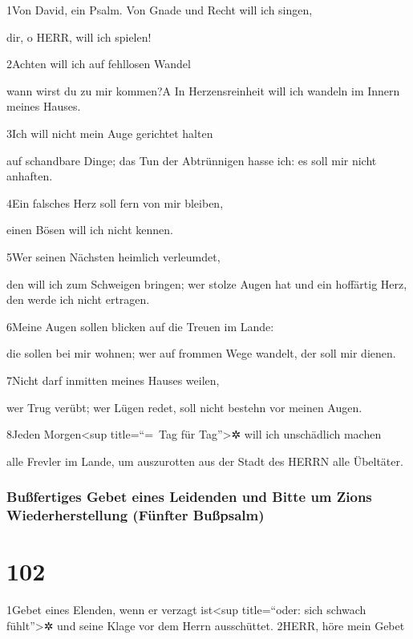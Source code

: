 1Von David, ein Psalm. Von Gnade und Recht will ich singen,

dir, o HERR, will ich spielen!

2Achten will ich auf fehllosen Wandel

wann wirst du zu mir kommen?{A} In Herzensreinheit will ich wandeln im
Innern meines Hauses.

3Ich will nicht mein Auge gerichtet halten

auf schandbare Dinge; das Tun der Abtrünnigen hasse ich: es soll mir
nicht anhaften.

4Ein falsches Herz soll fern von mir bleiben,

einen Bösen will ich nicht kennen.

5Wer seinen Nächsten heimlich verleumdet,

den will ich zum Schweigen bringen; wer stolze Augen hat und ein
hoffärtig Herz, den werde ich nicht ertragen.

6Meine Augen sollen blicken auf die Treuen im Lande:

die sollen bei mir wohnen; wer auf frommen Wege wandelt, der soll mir
dienen.

7Nicht darf inmitten meines Hauses weilen,

wer Trug verübt; wer Lügen redet, soll nicht bestehn vor meinen Augen.

8Jeden Morgen\textless sup title=``=~Tag für Tag''\textgreater✲ will ich
unschädlich machen

alle Frevler im Lande, um auszurotten aus der Stadt des HERRN alle
Übeltäter.

\hypertarget{buuxdffertiges-gebet-eines-leidenden-und-bitte-um-zions-wiederherstellung-fuxfcnfter-buuxdfpsalm}{%
\subsubsection{Bußfertiges Gebet eines Leidenden und Bitte um Zions
Wiederherstellung (Fünfter
Bußpsalm)}\label{buuxdffertiges-gebet-eines-leidenden-und-bitte-um-zions-wiederherstellung-fuxfcnfter-buuxdfpsalm}}

\hypertarget{section-101}{%
\section{102}\label{section-101}}

1Gebet eines Elenden, wenn er verzagt ist\textless sup title=``oder:
sich schwach fühlt''\textgreater✲ und seine Klage vor dem Herrn
ausschüttet. 2HERR, höre mein Gebet

